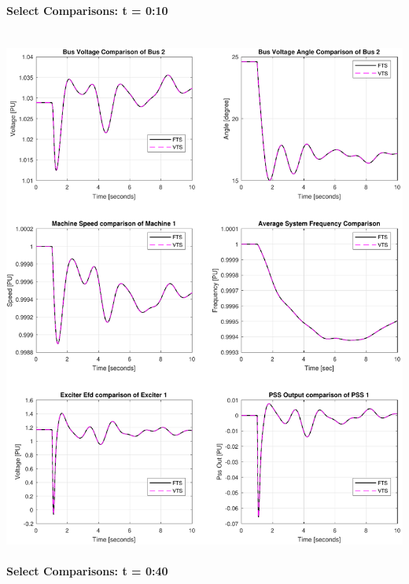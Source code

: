 \documentclass[12pt]{article}
\begin{document}
\pagebreak
\paragraph{Select Comparisons: t = 0:10} \ \\

\includegraphics[width=\linewidth]{MWdetailComp0}

\pagebreak
\paragraph{Select Comparisons: t = 0:40} \ \\
\end{document}
